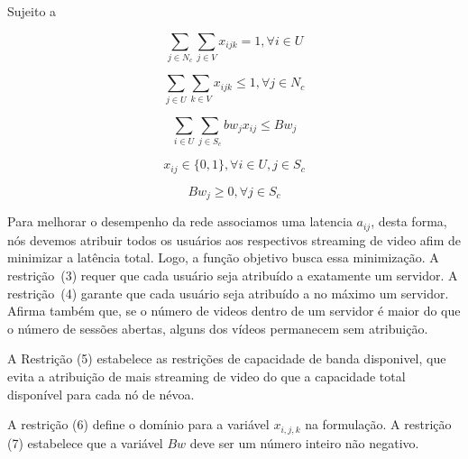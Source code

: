 Sujeito a

\begin{equation}\label{bound_1}
\sum_{ j \in N_{c} }
\sum_{ j \in V}
x_{ijk} = 1,  \forall i \in U
\end{equation}

\begin{equation}\label{bound_1}
\sum_{ j \in U}
\sum_{ k \in V }
x_{ijk} \leq 1,  \forall j \in N_{c}
\end{equation}

\begin{equation}\label{minimize}
\sum_{i \in U}
\sum_{j \in S_{c}}
bw_{j} x_{ij}
\leq Bw_{j}
\end{equation}

\begin{equation}\label{minimize}
x_{ij}  \in  \{0, 1\}, \forall i \in U,j \in S_{c}
\end{equation}

\begin{equation}\label{minimize}
Bw_{j} \geq  0, \forall j \in S_{c}
\end{equation}
\vspace{1.2cm}

Para melhorar o desempenho da rede associamos uma latencia $a_{ij}$, desta forma, nós devemos atribuir todos os usuários aos respectivos streaming de video afim de minimizar a latência total.
Logo, a função objetivo busca essa minimização. A restrição~(3) requer que cada usuário seja atribuído a exatamente um servidor. A restrição~(4) garante que cada usuário seja atribuído a no máximo um servidor. Afirma também que, se o número de videos dentro de um servidor é maior do que o número de sessões abertas, alguns dos vídeos permanecem sem atribuição.%

A Restrição (5) estabelece as restrições de capacidade de banda disponivel, que evita a atribuição de mais streaming de video do que a capacidade total disponível para cada nó de névoa.

A restrição (6) define o domínio para a variável $x_{i, j, k}$ na formulação. A restrição (7) estabelece que a variável $Bw$ deve ser um número inteiro não negativo.


